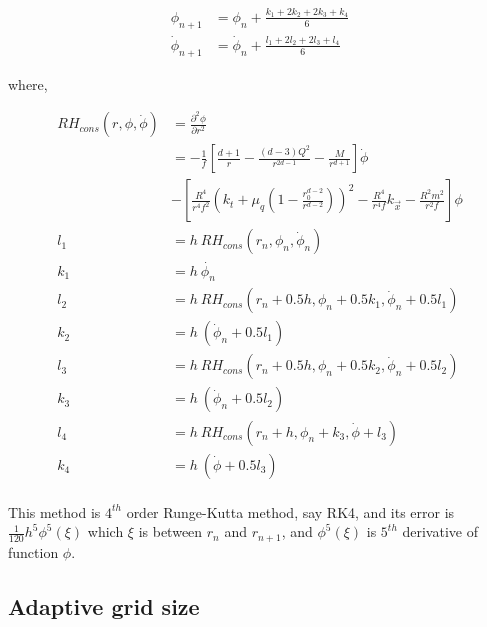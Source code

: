 \begin{align}
    \phi_{n+1}       &= \phi_n  + \frac{k_1+2k_2+2k_3+k_4}{6} \nonumber\\
    \dot{\phi}_{n+1} &= \dot{\phi}_n + \frac{l_1+2l_2+2l_3+l_4}{6}
\end{align}

where,

\begin{align}
    RH_{cons}(r,\phi,\dot{\phi}) &= \frac{\partial^2\phi}{\partial r^2} \nonumber\\
              &= - \frac{1}{f}\left[\frac{d+1}{r}-\frac{(d-3)Q^2}{r^{2d-1}}-\frac{M}{r^{d+1}}\right]\dot{\phi} \nonumber\\ 
              & - \left[\frac{R^4}{r^4f^2}\left(k_t + \mu_q(1-\frac{r_0^{d-2}}{r^{d-2}})\right)^2-\frac{R^4}{r^4f}k_{\vec{x}}-\frac{R^2m^2}{r^2f}\right]\phi \nonumber\\
    l_1 &= h~RH_{cons}(r_n,\phi_n,\dot{\phi}_n) \nonumber\\
    k_1 &= h~\dot{\phi_n} \nonumber\\
    l_2 &= h~RH_{cons}( r_n+0.5h , \phi_n+0.5k_1 , \dot{\phi}_n+0.5l_1) \nonumber\\
    k_2 &= h~(\dot{\phi}_n+0.5l_1) \nonumber\\
    l_3 &= h~RH_{cons}( r_n+0.5h , \phi_n+0.5k_2 , \dot{\phi}_n+0.5l_2) \nonumber\\
    k_3 &= h~(\dot{\phi}_n+0.5l_2) \nonumber\\
    l_4 &= h~RH_{cons}( r_n+h , \phi_n+k_3 , \dot{\phi}+l_3) \nonumber\\ 
    k_4 &= h~(\dot{\phi}+0.5l_3) \nonumber\\
\end{align}

This method is $4^{th}$ order Runge-Kutta method, say RK4, and its error is $\frac{1}{120}h^5\phi^{5}(\xi)$ which $\xi$ is between $r_n$ and $r_{n+1}$, and $\phi^{5}(\xi)$ is $5^{th}$ derivative of function $\phi$.

\subsection{Adaptive grid size}

